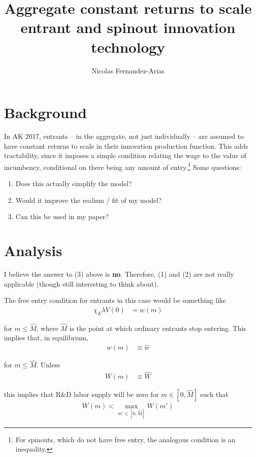 \documentclass[12pt,english]{article}
\theoremstyle{remark}
\begin{document}
	
\title{Aggregate constant returns to scale entrant and spinout innovation technology}
\author{Nicolas Fernandez-Arias}
\maketitle

\section{Background}

In AK 2017, entrants -- in the aggregate, not just individually -- are assumed to have constant returns to scale in their innovation production function. This adds tractability, since it imposes a simple condition relating the wage to the value of incumbency, conditional on there being any amount of entry.\footnote{For spinouts, which do not have free entry, the analogous condition is an inequality.} Some questions:

\begin{enumerate}
	\item Does this actually simplify the model?
	\item Would it improve the realism / fit of my model?
	\item Can this be used in my paper?
\end{enumerate}

\section{Analysis}

I believe the answer to (3) above is \textbf{no}. Therefore, (1) and (2) are not really applicable (though still interesting to think about).

The free entry condition for entrants in this case would be something like
\begin{align*}
	\chi_E \lambda V(0) &= w(m)
\end{align*}

for $m \le \hat{M}$, where $\hat{M}$ is the point at which ordinary entrants stop entering. This implies that, in equilibrium, 
\begin{align*}
	w(m) &\equiv \hat{w}
\end{align*}

for $m \le \hat{M}$. Unless
\begin{align*}
	W(m) &\equiv \hat{W}
\end{align*}

this implies that R\&D labor supply will be zero for $m \in [0,\hat{M}]$ such that 
\begin{align*}
	W(m) < \max_{m' \in [0,\hat{M}]} W(m') 
\end{align*}
\end{document}
